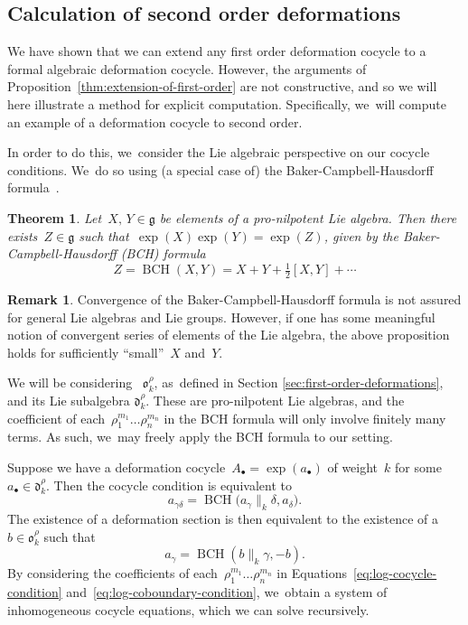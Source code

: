 \documentclass[10pt,a4paper]{article}
\numberwithin{equation}{section}
\let\oldbullet\bullet
\renewcommand{\bullet}{{\scriptscriptstyle\oldbullet}}
\theoremstyle{plain}
\newtheorem{theorem}[theoremcounter]{Theorem}
\theoremstyle{definition}
\newtheorem{remark}[theoremcounter]{Remark}
\newcommand{\tx}{\text}
\newcommand{\frakd}{\ensuremath{\mathfrak{d}}}
\newcommand{\frakg}{\ensuremath{\mathfrak{g}}}
\newcommand{\frako}{\ensuremath{\mathfrak{o}}}
\let\ga\gamma
\DeclareMathOperator{\BCH}{BCH}
\begin{document}
\subsection{Calculation of second order deformations}
\label{ssec:calculation_of_second_order_deformations}

We have shown that we can extend any first order deformation cocycle to a formal algebraic deformation cocycle. However, the arguments of Proposition~\ref{thm:extension-of-first-order} are not constructive, and so we will here illustrate a method for explicit computation. Specifically, we~will compute an example of a deformation cocycle to second order.

In order to do this, we~consider the Lie algebraic perspective on our cocycle conditions. We~do so using (a special case of) the Baker-Campbell-Hausdorff formula~\cite{dynkin47,bourbaki72}.

\begin{theorem}
Let~$X,\,Y\in\frakg$ be elements of a pro-nilpotent Lie algebra. Then there exists~$Z\in\frakg$ such that~$\exp(X) \exp(Y) = \exp(Z)$, given by the Baker-Campbell-Hausdorff (BCH) formula
\begin{equation}\label{eq:bch}
Z=\BCH(X,Y)=X + Y +\tfrac{1}{2}[X,Y]+\cdots
\end{equation}
\end{theorem}

\begin{remark}
Convergence of the Baker-Campbell-Hausdorff formula is not assured for general Lie algebras and Lie groups. However, if one has some meaningful notion of convergent series of elements of the Lie algebra, the above proposition holds for sufficiently ``small''~$X$ and~$Y$.
\end{remark}

We will be considering ~$\frako_k^\rho$, as~defined in Section \ref{sec:first-order-deformations}, and its Lie subalgebra $\frakd_k^\rho$. These are pro-nilpotent Lie algebras, and the coefficient of each~$\rho_1^{m_1}\ldots \rho_n^{m_n}$ in the BCH formula will only involve finitely many terms. As such, we~may freely apply the BCH formula to our setting.

Suppose we have a deformation cocycle~$A_\bullet = \exp(a_\bullet)$ of weight~$k$ for some~$a_\bullet\in\frakd_k^\rho$. Then the cocycle condition is equivalent to\vspace*{-3pt}
\begin{equation}\label{eq:log-cocycle-condition}
a_{\ga\delta} = \BCH\bigl(a_\ga\big\|_k\delta,a_\delta \bigr)
\tx{.}
\end{equation}
The existence of a deformation section is then equivalent to the existence of a~$b\in\frako_k^\rho$ such that\vspace*{-3pt}
\begin{equation}\label{eq:log-coboundary-condition}
a_\ga = \BCH(b\big\|_k\ga,-b)\tx{.}
\end{equation}
By considering the coefficients of each~$\rho_1^{m_1}\ldots\rho_n^{m_n}$ in Equations~\eqref{eq:log-cocycle-condition} and~\eqref{eq:log-coboundary-condition}, we~obtain a system of inhomogeneous cocycle equations, which we can solve recursively.
\end{document}
